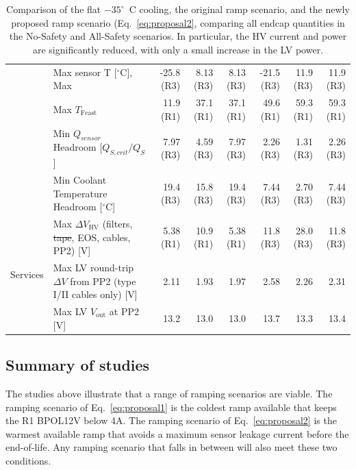 \begin{table}[ht]
\begin{centering}
{\begin{tabular}{|l|l|r|r|r|r|r|r|}
                                & Max sensor T [$^\circ$C], Max                                         &    -25.8 (R3) &     8.13 (R3) &     8.13 (R3) &     -21.5 (R3) &     11.9 (R3) &      11.9 (R3) \\ 
                                & Max $T_\text{Feast}$                                                  &     11.9 (R1) &     37.1 (R1) &     37.1 (R1) &      49.6 (R1) &     59.3 (R1) &      59.3 (R1) \\ 
                                & Min $Q_{sensor}$ Headroom [$Q_{S,crit}/Q_{S}$]                        &     7.97 (R3) &     4.59 (R3) &     7.97 (R3) &      2.26 (R3) &     1.31 (R3) &      2.26 (R3) \\ 
                                & Min Coolant Temperature Headroom [$^\circ$C]                          &     19.4 (R3) &     15.8 (R3) &     19.4 (R3) &      7.44 (R3) &     2.70 (R3) &      7.44 (R3) \\ \hline
\multirow{3}{*}{Services}       & Max $\Delta V_\text{HV}$ (filters, \sout{tape}, EOS, cables, PP2) [V] &     5.38 (R1) &     10.9 (R1) &     5.38 (R1) &      11.8 (R3) &     28.0 (R3) &      11.8 (R3) \\ 
                                & Max LV round-trip $\Delta V$ from PP2 (type I/II cables only) [V]     &          2.11 &          1.93 &          1.97 &           2.58 &          2.26 &           2.31 \\ 
                                & Max LV $V_\text{out}$ at PP2 [V]                                      &          13.2 &          13.0 &          13.0 &           13.7 &          13.3 &           13.4 \\ 
\hline\end{tabular}
} %
\caption*{Comparison of the flat $-35^\circ$~C cooling, the original ramp scenario, and the newly
proposed ramp scenario (Eq.~\ref{eq:proposal2}, comparing all endcap quantities in the No-Safety and
All-Safety scenarios. In particular, the
HV current and power are significantly reduced, with only a small increase in the LV power.
}
\end{centering}
\label{tab:proposal2_fullresults}
\end{table}

\subsection{Summary of studies}

The studies above illustrate that a range of ramping scenarios are viable. The ramping scenario of
Eq.~\ref{eq:proposal1} is the coldest ramp available that keeps the R1 BPOL12V below 4A. The ramping
scenario of Eq.~\ref{eq:proposal2} is the warmest available ramp that avoids a maximum sensor leakage
current before the end-of-life. Any ramping scenario that falls in between will also meet these two
conditions.
